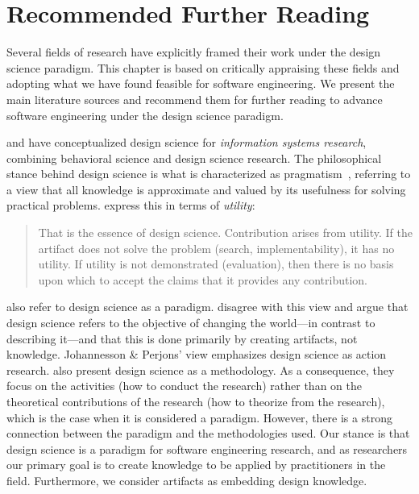 \documentclass[graybox]{svmult}
\begin{document}
\section{Recommended Further Reading}
\label{sec:reading}
Several fields of research have explicitly framed their work under the design science paradigm. This chapter is based on critically appraising these fields and adopting what we have found feasible for software engineering. We present the main literature sources and recommend them for further reading to advance software engineering under the design science paradigm.

\cite{hevner_design_2004} and \cite{hevner_design_2010} have conceptualized design science for \emph{information systems research}, combining behavioral science and design science research.
The philosophical stance behind design science is what is characterized as pragmatism~\citep{easterbrook_selecting_2008}, referring to a view that all knowledge is approximate and valued by its usefulness for solving practical problems. \cite{hevner_design_2004} express this in terms of \emph{utility}: 

\begin{quote}
	That is the essence of design science. Contribution arises from utility. If the artifact does not solve the problem (search, implementability), it has no utility. If utility is not demonstrated (evaluation), then there is no basis upon which to accept the claims that it provides any contribution.
\end{quote}


\cite{gregor_positioning_2013} also refer to design science as a paradigm. \cite{johannesson_introduction_2014} disagree with this view and argue that design science refers to the objective of changing the world---in contrast to describing it---and that this is done primarily by creating artifacts, not knowledge. Johannesson \& Perjons' view emphasizes design science as action research. \cite{Wohlin2015} also present design science as a methodology. As a consequence, they focus on the activities (how to conduct the research) rather than on the theoretical contributions of the research (how to theorize from the research), which is the case when it is considered a paradigm. However, there is a strong connection between the paradigm and the methodologies used.
Our stance is that design science is a paradigm for software engineering research, and as researchers our primary goal is to create knowledge to be applied by practitioners in the field. Furthermore, we consider artifacts as embedding design knowledge. 
\end{document}
